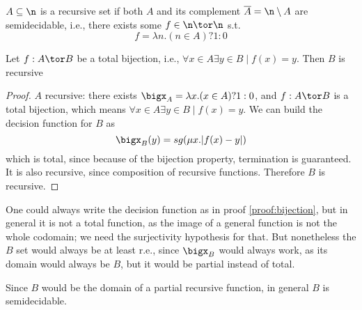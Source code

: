 \begin{definition}
  \(A\subseteq \n\) is a recursive set if both \(A\) and its
  complement \(\overline{A} = \n \setminus A\) are semidecidable,
  i.e., there exists some \(f \in \n \tor \n\) s.t. \[f = \lambda n
  . (n \in A) ? 1 : 0\]
\end{definition}

\begin{theorem}\label{th:bijection}
  Let \(f : A \tor B\) be a total bijection, i.e., \(\forall x \in A
  \exists y \in B \mid f(x) = y\). Then \(B\) is recursive
\end{theorem}

\begin{proof}\label{proof:bijection}
  \(A\) recursive: there exists \(\bigx_A = \lambda x . (x \in A)? 1 :
  0\), and \(f : A \tor B\) is a total bijection, which means
  \(\forall x \in A \exists y \in B \mid f(x) = y\). We can build the
  decision function for \(B\) as \[\bigx_B(y) = sg(\mu x . |f(x) -
  y|)\] which is total, since because of the bijection property,
  termination is guaranteed. It is also recursive, since composition
  of recursive functions. Therefore \(B\) is recursive.
\end{proof}

\begin{observation}\label{obs:bijection}
  One could always write the decision function as in proof
  \ref{proof:bijection}, but in general it is not a total function, as
  the image of a general function is not the whole codomain; we need
  the surjectivity hypothesis for that. But nonetheless the \(B\) set
  would always be at least r.e., since \(\bigx_B\) would always work,
  as its domain would always be \(B\), but it would be partial instead
  of total.

  Since \(B\) would be the domain of a partial recursive function, in
  general \(B\) is semidecidable.
\end{observation}
